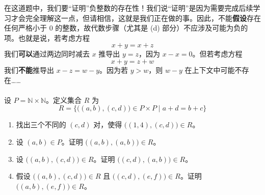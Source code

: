\begin{exercise}\label{exc:exercises3.11.22} 
    在这道题中，我们要``证明''负整数的存在性！我们说``证明''是因为需要完成后续学习才会完全理解这一点，但请相信，这就是我们正在做的事。因此，不能\textbf{假设}存在任何严格小于 $0$ 的整数，故代数步骤（尤其是 (d) 部分）不应涉及可能为负的项。也就是说，若考虑方程
    \[x + y = x + z\]
    我们\textbf{可以}通过两边同时减去 $x$ 推导出 $y = z$，因为 $x - x = 0$。但若考虑方程
    \[x + y = z + w\]
    我们\textbf{不能}推导出 $x - z = w - y$。因为若 $y > w$，则 $w - y$ 在上下文中可能不存在……\\
    \\
    设 $P = \mathbb{N} \times \mathbb{N}$。定义集合 $R$ 为
    \[R = \big\{\big((a, b),(c, d)\big) \in P \times P \mid a + d = b + c \big\}\]
    \begin{enumerate}[label=(\alph*)]
        \item 找出三个不同的 $(c, d)$ 对，使得 $\big((1, 4),(c, d)\big) \in R$。
        \item 设 $(a, b) \in P$。证明 $\big((a, b),(a, b)\big) \in R$。
        \item 设 $\big((a, b),(c, d)\big) \in R$。证明 $\big((c, d),(a, b)\big) \in R$。
        \item 假设 $\big((a, b),(c, d)\big) \in R$ 且 $\big((c, d),(e, f)\big) \in R$。证明 $\big((a, b),(e, f)\big) \in R$。
    \end{enumerate}
\end{exercise}